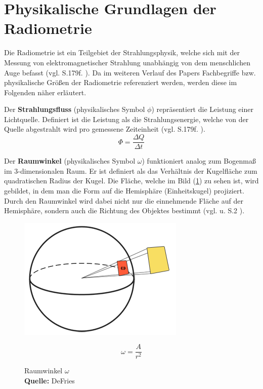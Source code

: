 \documentclass[
  11pt,
  a4paper,
  oneside
  ]{article}
\begin{document}
\section{Physikalische Grundlagen der Radiometrie}\label{sec:radiometrie}
Die Radiometrie ist ein Teilgebiet der Strahlungsphysik, welche sich mit der Messung von elektromagnetischer Strahlung unabhängig von dem menschlichen Auge befasst 
(vgl. S.179f. \cite{Beyerer2016}). Da im weiteren Verlauf des Papers Fachbegriffe bzw. physikalische Größen der Radiometrie referenziert werden, werden diese im Folgenden näher erläutert. 

Der \textbf{Strahlungsfluss} (physikalisches Symbol $\phi$) repräsentiert die Leistung einer Lichtquelle. Definiert ist die Leistung als die Strahlungsenergie, welche von der Quelle abgestrahlt wird pro gemessene Zeiteinheit (vgl. S.179f. \cite{Beyerer2016}). 
\begin{equation}
  \Phi =\dfrac{\Delta Q}{\Delta t}
\end{equation}

Der \textbf{Raumwinkel} (physikalisches Symbol $\omega$) funktioniert analog zum Bogenmaß im 3-dimensionalen Raum. Er ist definiert als das Verhältnis der Kugelfläche zum quadratischen Radius der Kugel. Die Fläche, welche im Bild
(\ref{fig:img6}) zu sehen ist, wird gebildet, in dem man die Form auf die Hemisphäre (Einheitskugel) projiziert. Durch den Raumwinkel wird dabei nicht nur die einnehmende Fläche auf der Hemisphäre, sondern auch die Richtung des Objektes bestimmt 
(vgl. \cite{learnOpenGL} u. S.2 \cite{irrlichtOrg}). 
\begin{figure}[H]
  \centering
  \begin{minipage}{.5\textwidth}
    \centering
    \includegraphics*[width=0.8\linewidth]{images/solid_angle.png}
    \caption{Raumwinkel $\omega$ \hfill \\ \footnotesize\textbf{Quelle:} DeFries\cite{learnOpenGL}}
    \label{fig:img6}
  \end{minipage}%
  \hfill
  \begin{minipage}{.5\textwidth}
    \begin{equation}
      \omega =\dfrac{A}{r^{2}}
    \end{equation}
  \end{minipage}
\end{figure}
\end{document}
